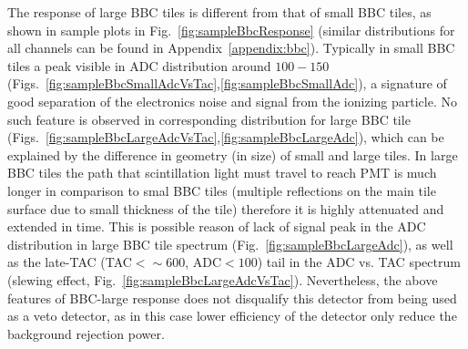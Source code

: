 The response of large BBC tiles is different from that of small BBC tiles, as shown in sample plots in Fig.~\ref{fig:sampleBbcResponse} (similar distributions for all channels can be found in Appendix~\ref{appendix:bbc}). Typically in small BBC tiles a peak visible in ADC distribution around $100-150$ (Figs.~\ref{fig:sampleBbcSmallAdcVsTac},\ref{fig:sampleBbcSmallAdc}), a signature of good separation of the electronics noise and signal from the ionizing particle. No such feature is observed in corresponding distribution for large BBC tile (Figs.~\ref{fig:sampleBbcLargeAdcVsTac},\ref{fig:sampleBbcLargeAdc}), which can be explained by the difference in geometry (in size) of small and large tiles. In large BBC tiles the path that scintillation light must travel to reach PMT is much longer in comparison to smal BBC tiles (multiple reflections on the main tile surface due to small thickness of the tile) therefore it is highly attenuated and extended in time. This is possible reason of lack of signal peak in the ADC distribution in large BBC tile spectrum (Fig.~\ref{fig:sampleBbcLargeAdc}), as well as the late-TAC (TAC$<\sim600$, ADC$<100$) tail in the ADC vs. TAC spectrum (slewing effect, Fig.~\ref{fig:sampleBbcLargeAdcVsTac}). Nevertheless, the above features of BBC-large response does not disqualify this detector from being used as a veto detector, as in this case lower efficiency of the detector only reduce the background rejection power.


